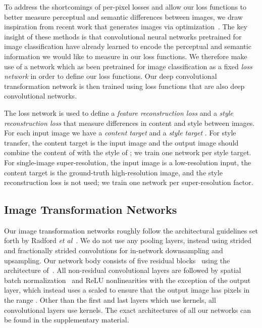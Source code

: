 \documentclass[runningheads]{llncs}
\newcommand{\etal}{\textit{et al}}
\begin{document}
To address the shortcomings of per-pixel losses and allow our loss functions to better
measure perceptual and semantic differences between images, we draw inspiration from recent
work that generates images via optimization~\cite{mahendran15understanding,simonyan2013deep,yosinski2015understanding,Gatys2015b,gatys2015neural}.
The key insight of these methods is that convolutional neural networks pretrained for image
classification have already learned to encode the perceptual and semantic information we
would like to measure in our loss functions. We therefore make use of a network 
which as been pretrained for image classification as a fixed \emph{loss network} in order
to define our loss functions. Our deep convolutional transformation network is then trained
using loss functions that are also deep convolutional networks.

The loss network  is used to define a \emph{feature reconstruction loss}
 and a \emph{style reconstruction loss}  that measure
differences in content and style between images. For each input image  we have a
\emph{content target}  and a \emph{style target} . For style transfer, the content
target  is the input image  and the output image  should combine the content of
 with the style of ; we train one network per style target. For single-image
super-resolution, the input image  is a low-resolution input, the content target  is
the ground-truth high-resolution image, and the style reconstruction loss is not used; we
train one network per super-resolution factor.










\subsection{Image Transformation Networks}
\label{sec:arch}
Our image transformation networks roughly follow the architectural guidelines set forth
by Radford \etal~\cite{radford2015unsupervised}. We do not use any pooling layers, instead
using strided and fractionally strided convolutions for in-network downsampling and upsampling.
Our network body consists of five residual blocks~\cite{he2015deep} using the architecture
of~\cite{gross2016training}. All non-residual convolutional layers are followed by spatial batch
normalization~\cite{ioffe2015batch} and ReLU nonlinearities with the exception of the output
layer, which instead uses a scaled  to ensure that the output image has pixels in the
range . Other than the first and last layers which use  kernels, all
convolutional layers use  kernels. The exact architectures of all our networks
can be found in the supplementary material.
\end{document}

